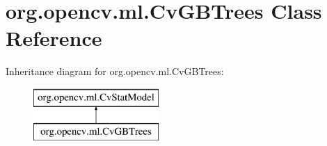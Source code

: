 \hypertarget{classorg_1_1opencv_1_1ml_1_1_cv_g_b_trees}{}\section{org.\+opencv.\+ml.\+Cv\+G\+B\+Trees Class Reference}
\label{classorg_1_1opencv_1_1ml_1_1_cv_g_b_trees}
Inheritance diagram for org.\+opencv.\+ml.\+Cv\+G\+B\+Trees\+:\begin{figure}[H]
\begin{center}
\leavevmode
\includegraphics[height=2.000000cm]{classorg_1_1opencv_1_1ml_1_1_cv_g_b_trees}
\end{center}
\end{figure}
